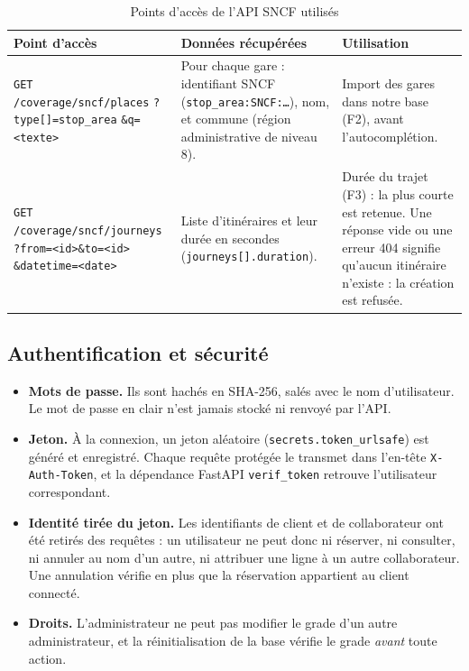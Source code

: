 \documentclass[11pt,a4paper]{article}
\newcommand{\route}[1]{\texttt{#1}}
\newcommand{\code}[1]{\texttt{#1}}
\begin{document}
\begin{table}[H]
\centering\small
\begin{tabularx}{\textwidth}{@{}p{4.3cm} Y Y@{}}
\toprule
\textbf{Point d'accès} & \textbf{Données récupérées} & \textbf{Utilisation} \\
\midrule
\route{GET /coverage/sncf/places} \newline \code{?type[]=stop\_area} \newline \code{\&q=<texte>}
  & Pour chaque gare : identifiant SNCF (\code{stop\_area:SNCF:\dots}), nom, et commune
    (région administrative de niveau 8).
  & Import des gares dans notre base (F2), avant l'autocomplétion. \\
\route{GET /coverage/sncf/journeys} \newline \code{?from=<id>\&to=<id>} \newline \code{\&datetime=<date>}
  & Liste d'itinéraires et leur durée en secondes (\code{journeys[].duration}).
  & Durée du trajet (F3) : la plus courte est retenue. Une réponse vide ou une erreur 404 signifie
    qu'aucun itinéraire n'existe : la création est refusée. \\
\bottomrule
\end{tabularx}
\caption{Points d'accès de l'API SNCF utilisés}\label{tab:sncf}
\end{table}

\subsection{Authentification et sécurité}

\begin{itemize}[itemsep=2pt]
  \item \textbf{Mots de passe.} Ils sont hachés en SHA-256, salés avec le nom d'utilisateur. Le mot
        de passe en clair n'est jamais stocké ni renvoyé par l'API.
  \item \textbf{Jeton.} À la connexion, un jeton aléatoire (\code{secrets.token\_urlsafe}) est
        généré et enregistré. Chaque requête protégée le transmet dans l'en-tête
        \code{X-Auth-Token}, et la dépendance FastAPI \code{verif\_token} retrouve l'utilisateur
        correspondant.
  \item \textbf{Identité tirée du jeton.} Les identifiants de client et de collaborateur ont été
        retirés des requêtes : un utilisateur ne peut donc ni réserver, ni consulter, ni annuler au
        nom d'un autre, ni attribuer une ligne à un autre collaborateur. Une annulation vérifie en
        plus que la réservation appartient au client connecté.
  \item \textbf{Droits.} L'administrateur ne peut pas modifier le grade d'un autre administrateur,
        et la réinitialisation de la base vérifie le grade \emph{avant} toute action.
\end{itemize}
\end{document}
